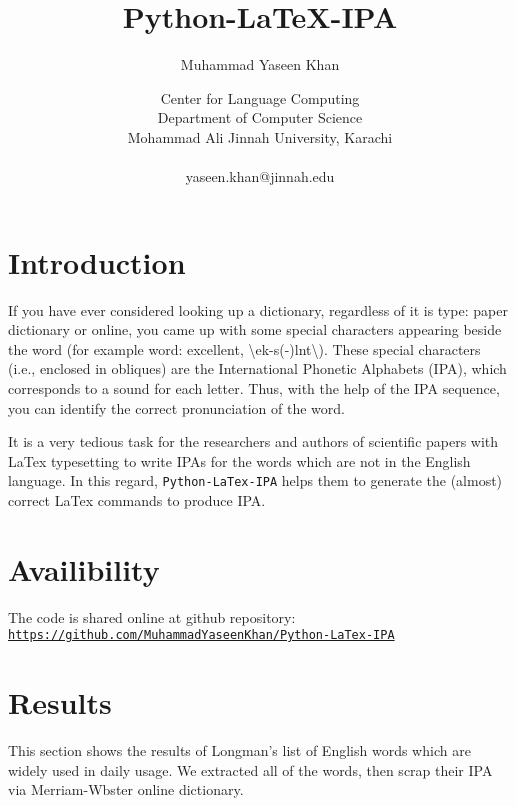 \documentclass[10pt,a4paper]{article}
\title{\textbf{Python-\LaTeX-IPA}}
\author{Muhammad Yaseen Khan}
\date{Center for Language Computing\\Department of Computer Science\\ Mohammad Ali Jinnah University, Karachi\\\ \\
yaseen.khan@jinnah.edu}
\begin{document}
\maketitle

\section{Introduction}
If you have ever considered looking up a dictionary, regardless of it is type: paper dictionary or online, you came up with some special characters appearing beside the word (for example word: excellent, \textbackslash\textprimstress ek-s(\textschwa-)l\textschwa nt\textbackslash). These special characters (i.e., enclosed in obliques) are the International Phonetic Alphabets (IPA), which corresponds to a sound for each letter. Thus, with the help of the IPA sequence, you can identify the correct pronunciation of the word.

It is a very tedious task for the researchers and authors of scientific papers with LaTex typesetting to write IPAs for the words which are not in the English language. In this regard, \texttt{Python-LaTex-IPA} helps them to generate the (almost) correct LaTex commands to produce IPA.

\section{Availibility}
The code is shared online at github repository:\texttt{ \hyperref[https://github.com/MuhammadYaseenKhan/Python-LaTex-IPA]{https://github.com/MuhammadYaseenKhan/Python-LaTex-IPA}}

\section{Results}
This section shows the results of Longman's list of English words which are widely used in daily usage. We extracted all of the words, then scrap their IPA via Merriam-Wbster online dictionary.
\end{document}
